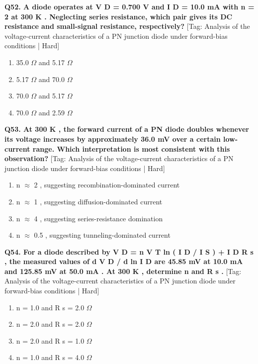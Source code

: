 \noindent\textbf{Q52. A diode operates at V D = 0.700 V and I D = 10.0 mA with n = 2 at 300 K . Neglecting series resistance, which pair gives its DC resistance and small-signal resistance, respectively?} \hfill [Tag: Analysis of the voltage-current characteristics of a PN junction diode under forward-bias conditions | Hard]
\begin{enumerate}[label=(\alph*),topsep=2pt,itemsep=1pt,partopsep=0pt,parsep=0pt]
    \item {35.0 $\Omega$ and 5.17 $\Omega$}
    \item {5.17 $\Omega$ and 70.0 $\Omega$}
    \item {70.0 $\Omega$ and 5.17 $\Omega$}
    \item {70.0 $\Omega$ and 2.59 $\Omega$}
\end{enumerate}
\vspace{2mm}

\noindent\textbf{Q53. At 300 K , the forward current of a PN diode doubles whenever its voltage increases by approximately 36.0 mV over a certain low-current range. Which interpretation is most consistent with this observation?} \hfill [Tag: Analysis of the voltage-current characteristics of a PN junction diode under forward-bias conditions | Hard]
\begin{enumerate}[label=(\alph*),topsep=2pt,itemsep=1pt,partopsep=0pt,parsep=0pt]
    \item {n $\approx$ 2 , suggesting recombination-dominated current}
    \item {n $\approx$ 1 , suggesting diffusion-dominated current}
    \item {n $\approx$ 4 , suggesting series-resistance domination}
    \item {n $\approx$ 0.5 , suggesting tunneling-dominated current}
\end{enumerate}
\vspace{2mm}

\noindent\textbf{Q54. For a diode described by V D = n V T ln ( I D / I S ) + I D R s , the measured values of d V D / d ln I D are 45.85 mV at 10.0 mA and 125.85 mV at 50.0 mA . At 300 K , determine n and R s .} \hfill [Tag: Analysis of the voltage-current characteristics of a PN junction diode under forward-bias conditions | Hard]
\begin{enumerate}[label=(\alph*),topsep=2pt,itemsep=1pt,partopsep=0pt,parsep=0pt]
    \item {n = 1.0 and R s = 2.0 $\Omega$}
    \item {n = 2.0 and R s = 2.0 $\Omega$}
    \item {n = 2.0 and R s = 1.0 $\Omega$}
    \item {n = 1.0 and R s = 4.0 $\Omega$}
\end{enumerate}
\vspace{2mm}

